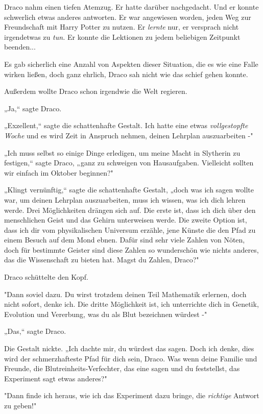 {Draco nahm einen tiefen Atemzug. Er hatte darüber nachgedacht. Und er konnte schwerlich etwas anderes antworten. Er war angewiesen worden, jeden Weg zur Freundschaft mit Harry Potter zu nutzen. Er \emph{lernte} nur, er versprach nicht irgendetwas zu \emph{tun.} Er konnte die Lektionen zu jedem beliebigen Zeitpunkt beenden...

Es gab sicherlich eine Anzahl von Aspekten dieser Situation, die es wie eine Falle wirken ließen, doch ganz ehrlich, Draco sah nicht wie das schief gehen konnte.

Außerdem wollte Draco schon irgendwie die Welt regieren.

„Ja,“ sagte Draco.

„Exzellent,“ sagte die schattenhafte Gestalt. Ich hatte eine etwas \emph{vollgestopfte Woche} und es wird Zeit in Anspruch nehmen, deinen Lehrplan auszuarbeiten -"

„Ich muss selbst so einige Dinge erledigen, um meine Macht in Slytherin zu festigen,“ sagte Draco, „ganz zu schweigen von Hausaufgaben. Vielleicht sollten wir einfach im Oktober beginnen?"

„Klingt vernünftig,“ sagte die schattenhafte Gestalt, „doch was ich sagen wollte war, um deinen Lehrplan auszuarbeiten, muss ich wissen, was ich dich lehren werde. Drei Möglichkeiten drängen sich auf. Die erste ist, dass ich dich über den menschlichen Geist und das Gehirn unterweisen werde. Die zweite Option ist, dass ich dir vom physikalischen Universum erzähle, jene Künste die den Pfad zu einem Besuch auf dem Mond ebnen. Dafür sind sehr viele Zahlen von Nöten, doch für bestimmte Geister sind diese Zahlen so wunderschön wie nichts anderes, das die Wissenschaft zu bieten hat. Magst du Zahlen, Draco?"

Draco schüttelte den Kopf.

"Dann soviel dazu. Du wirst trotzdem deinen Teil Mathematik erlernen, doch nicht sofort, denke ich. Die dritte Möglichkeit ist, ich unterrichte dich in Genetik, Evolution und Vererbung, was du als Blut bezeichnen würdest -"

„Das,“ sagte Draco.

Die Gestalt nickte. „Ich dachte mir, du würdest das sagen. Doch ich denke, dies wird der schmerzhafteste Pfad für dich sein, Draco. Was wenn deine Familie und Freunde, die Blutreinheits-Verfechter, das eine sagen und du feststellst, das Experiment sagt etwas anderes?"

"Dann finde ich heraus, wie ich das Experiment dazu bringe, die \emph{richtige} Antwort zu geben!"

}

